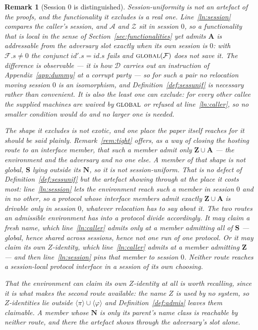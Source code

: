\documentclass[11pt,a4paper]{article}
\newcommand{\admits}{\mathbf{N}}
\newcommand{\Apid}{\mathbf{A}}
\newcommand{\Zpid}{\mathbf{Z}}
\newcommand{\Spid}{\mathbf{S}}
\newcommand{\F}{\mathcal{F}}
\newcommand{\Zenv}{\mathcal{Z}}
\newcommand{\Adv}{\mathcal{A}}
\newcommand{\Dum}{\mathcal{D}}
\newcommand{\op}[1]{\textsc{#1}}
\newcommand{\id}{id}
\newcommand{\ncl}[1]{\langle #1 \rangle}
\theoremstyle{accentdef}
\newtheorem{remark}[definition]{Remark}
\theoremstyle{accentplain}
\begin{document}
\begin{remark}[Session $0$ is distinguished]\label{rem:sesszero}
Session-uniformity is not an artefact of the proofs, and the functionality it excludes is a real one.
Line~\ref{ln:session} compares the \emph{caller's} session, and $\Adv$ and $\Zenv$ sit in session $0$,
so a functionality that is \emph{local} in the sense of Section~\ref{sec:functionalities} yet admits
$\Apid$ is addressable from the adversary slot exactly when its own session is $0$: with
$\F.s \neq 0$ the conjunct $\id'.s = \id.s$ fails and $\op{global}(\F)$ does not save it. The
difference is observable --- it is how $\Dum$ carries out an instruction of Appendix~\ref{app:dummy}
at a corrupt party --- so for such a pair no relocation moving session $0$ is an isomorphism, and
Definition~\ref{def:sessunif} is necessary rather than convenient. It is also the least one can
exclude: for every other callee the supplied machines are waived by $\op{global}$ or refused at
line~\ref{ln:caller}, so no smaller condition would do and no larger one is needed.

The shape it excludes is not exotic, and one place the paper itself reaches for it should be said
plainly. Remark~\ref{rem:tight} offers, as a way of closing the hosting route to an
\emph{interface} member, that such a member admit only $\Zpid \cup \Apid$ --- the environment and the
adversary and no one else. A member of that shape is not global, $\Spid$ lying outside its $\admits$,
so it is not session-uniform. That is no defect of Definition~\ref{def:sessunif} but the artefact
showing through at the place it costs most: line~\ref{ln:session} lets the environment reach such a
member in session $0$ and in no other, so a protocol whose interface members admit exactly
$\Zpid \cup \Apid$ is drivable only in session $0$, whatever relocation has to say about it. The two
routes an admissible environment has into a protocol divide accordingly. It may claim a fresh name,
which line~\ref{ln:caller} admits only at a member admitting all of $\Spid$ --- global, hence shared
across sessions, hence not one run of one protocol. Or it may claim its own $Z$-identity, which
line~\ref{ln:caller} admits at a member admitting $\Zpid$ --- and then line~\ref{ln:session} pins that
member to session $0$. Neither route reaches a session-local protocol interface in a session of its
own choosing.

That the environment can claim its own $Z$-identity at all is worth recalling, since it is what makes
the second route available: the name $Z$ is used by no system, so $Z$-identities lie outside
$\ncl{\pi} \cup \ncl{\varphi}$ and Definition~\ref{def:admis} leaves them claimable. A member whose
$\admits$ is only its parent's name class is reachable by neither route, and there the artefact shows
through the adversary's slot alone.


\end{remark}
\end{document}
